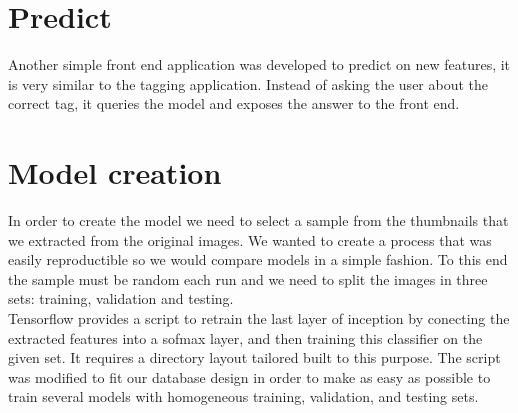 \begin{figure}[h]
  \begin{center}
  \end{center}
\end{figure}

\section{Predict}

Another simple front end application was developed to predict on new features, it is very similar to the tagging application. Instead of asking the user about the correct tag, it queries the model and exposes the answer to the front end.\\



\section{Model creation}

In order to create the model we need to select a sample from the thumbnails that we extracted from the original images. We wanted to create a process that was easily reproductible so we would compare models in a simple fashion. To this end the sample must be random each run and we need to split the images in three sets: training, validation and testing.\\

Tensorflow provides a script to retrain the last layer of inception by conecting the extracted features into a sofmax layer, and then training this classifier on the given set. It requires a directory layout tailored built to this purpose. The script was modified to fit our database design in order to make as easy as possible to train several models with homogeneous training, validation, and testing sets.


